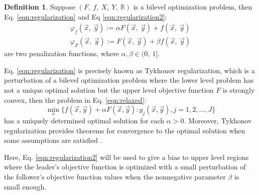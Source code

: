 \documentclass[conference]{IEEEtran}
\theoremstyle{definition}
\newtheorem{definition}{Definition}[section]
\begin{document}
\begin{definition}
    Suppose $(F, \ f, \ X, \ Y, \ \mathbb{R} )$ is a bilevel optimization problem,
    then Eq. \ref{eqn:regularization} and Eq \ref{eqn:regularization2}:
    \begin{align}
        \label{eqn:regularization}
        \varphi_f (\vec{x},\ \vec{y}) := \alpha F(\vec{x},\ \vec{y}) +  f(\vec{x},\ \vec{y}) \\
        \label{eqn:regularization2}
        \varphi_F (\vec{x},\ \vec{y}) := F(\vec{x},\ \vec{y}) +  \beta f(\vec{x},\ \vec{y})
    \end{align}
    are two penalization functions, where $\alpha, \beta \in (0,\ 1]$.
\end{definition}
% 
Eq. \ref{eqn:regularization} is precisely known as Tykhonov regularization, which is a
perturbation of a bilevel optimization problem where the lower level problem has
not a unique optimal solution but the upper level objective function $F$ is 
strongly convex, then the problem in Eq. \ref{eqn:relaxed}:
\begin{equation}
    \min_x \{ f(\vec{x},\vec{y}) + \alpha F(\vec{x}, \vec{y}) : g_j(\vec{x}, \vec{y}), j=1,2,\ldots, J\} 
    \label{eqn:relaxed}
\end{equation}
% 
has a uniquely determined optimal solution for each $\alpha > 0$. 
Moreover, Tykhonov regularization provides theorems for convergence to the optimal
solution when some assumptions are satisfied \cite{dempe2002foundations}. 

Here, Eq. \ref{eqn:regularization2} will be used to give a bias to upper level
regions where the leader's objective function is optimized with a small perturbation
of the follower's objective function values when the nonnegative parameter $\beta$
is small enough. 
\end{document}
